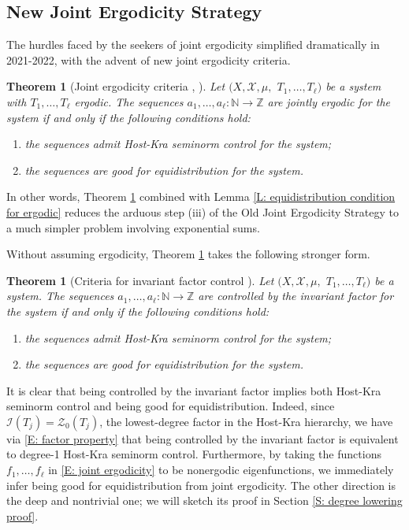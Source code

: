 \documentclass[11pt]{amsart}
\newtheorem{theorem}[lemma]{Theorem}
\theoremstyle{definition}
\newcommand{\N}{{\mathbb N}}
\newcommand{\Z}{{\mathbb Z}}
\newcommand{\CI}{{\mathcal I}}
\newcommand{\CX}{{\mathcal X}}
\newcommand{\CZ}{{\mathcal Z}}
\newcommand{\1}{{\mathbf{1}}}
\begin{document}
\subsection{New Joint Ergodicity Strategy}
The hurdles faced by the seekers of joint ergodicity simplified dramatically in 2021-2022, with the advent of  new joint ergodicity criteria.
\begin{theorem}[Joint ergodicity criteria {\cite[Theorem 1.1]{Fr21}, \cite[Theorem 2.5]{FrKu22a}}]\label{T: joint ergodicity criteria}
        Let $(X, \CX, \mu,$\! $T_1, \ldots, T_\ell)$ be a system with $T_1, \ldots, T_\ell$ ergodic. The sequences $a_1,\ldots,a_\ell\colon \N\to \Z$ are jointly ergodic for the system if and only if the following conditions hold:
        \begin{enumerate}
            \item the sequences admit Host-Kra seminorm control for the system;
            \item the sequences are good for equidistribution for the system.
        \end{enumerate}
\end{theorem}
In other words, Theorem \ref{T: joint ergodicity criteria} combined with Lemma \ref{L: equidistribution condition for ergodic} reduces the arduous step (iii) of the Old Joint Ergodicity Strategy to a much simpler problem involving exponential sums. 

Without assuming ergodicity, Theorem \ref{T: joint ergodicity criteria} takes the following stronger form.
\begin{theorem}[Criteria for invariant factor control {\cite[Theorem 2.5]{FrKu22a}}]\label{T: invariant control criteria}
        Let $(X, \CX, \mu,$\! $T_1, \ldots, T_\ell)$ be a system. The sequences $a_1,\ldots,a_\ell\colon \N\to \Z$ are controlled by the invariant factor for the system if and only if the following conditions hold:
        \begin{enumerate}
            \item the sequences admit Host-Kra seminorm control for the system;
            \item the sequences are good for equidistribution for the system.
        \end{enumerate}
\end{theorem}
It is clear that being controlled by the invariant factor implies both Host-Kra seminorm control and being good for equidistribution. Indeed, since $\CI(T_j) = \CZ_0(T_j)$, the lowest-degree factor in the Host-Kra hierarchy, we have via \eqref{E: factor property} that being controlled by the invariant factor is equivalent to degree-1 Host-Kra seminorm control. Furthermore, by taking the functions $f_1, \ldots, f_\ell$ in \eqref{E: joint ergodicity} to be nonergodic eigenfunctions, we immediately infer being good for equidistribution from joint ergodicity. The other direction is the deep and nontrivial one; we will sketch its proof in Section \ref{S: degree lowering proof}.
\end{document}
